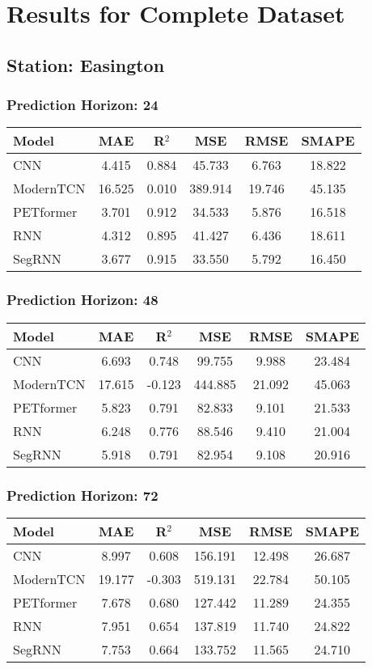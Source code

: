 \section*{Results for Complete Dataset}
\subsection*{Station: Easington}
\subsubsection*{Prediction Horizon: 24}
\begin{tabular}{lccccc}
\toprule
Model & MAE & R$^2$ & MSE & RMSE & SMAPE \\
\midrule
CNN & 4.415 & 0.884 & 45.733 & 6.763 & 18.822 \\
ModernTCN & 16.525 & 0.010 & 389.914 & 19.746 & 45.135 \\
PETformer & 3.701 & 0.912 & 34.533 & 5.876 & 16.518 \\
RNN & 4.312 & 0.895 & 41.427 & 6.436 & 18.611 \\
SegRNN & 3.677 & 0.915 & 33.550 & 5.792 & 16.450 \\
\bottomrule
\end{tabular}
\vspace{0.5cm}
\subsubsection*{Prediction Horizon: 48}
\begin{tabular}{lccccc}
\toprule
Model & MAE & R$^2$ & MSE & RMSE & SMAPE \\
\midrule
CNN & 6.693 & 0.748 & 99.755 & 9.988 & 23.484 \\
ModernTCN & 17.615 & -0.123 & 444.885 & 21.092 & 45.063 \\
PETformer & 5.823 & 0.791 & 82.833 & 9.101 & 21.533 \\
RNN & 6.248 & 0.776 & 88.546 & 9.410 & 21.004 \\
SegRNN & 5.918 & 0.791 & 82.954 & 9.108 & 20.916 \\
\bottomrule
\end{tabular}
\vspace{0.5cm}
\subsubsection*{Prediction Horizon: 72}
\begin{tabular}{lccccc}
\toprule
Model & MAE & R$^2$ & MSE & RMSE & SMAPE \\
\midrule
CNN & 8.997 & 0.608 & 156.191 & 12.498 & 26.687 \\
ModernTCN & 19.177 & -0.303 & 519.131 & 22.784 & 50.105 \\
PETformer & 7.678 & 0.680 & 127.442 & 11.289 & 24.355 \\
RNN & 7.951 & 0.654 & 137.819 & 11.740 & 24.822 \\
SegRNN & 7.753 & 0.664 & 133.752 & 11.565 & 24.710 \\
\bottomrule
\end{tabular}
\vspace{0.5cm}
